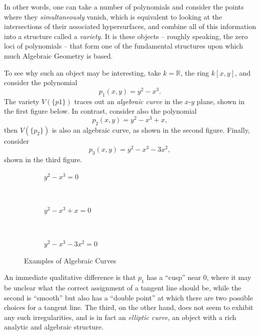 \documentclass{article}
\theoremstyle{definition}
\newcommand{\RR}{\mathbb{R}}
\newcommand{\theset}[1]{\{ #1 \}}
\begin{document}
In other words, one can take a number of polynomials and consider the
points where they \emph{simultaneously} vanish, which is equivalent to
looking at the intersections of their associated hypersurfaces, and
combine all of this information into a structure called a
\emph{variety}. It is these objects -- roughly speaking, the zero loci
of polynomials -- that form one of the fundamental structures upon
which much Algebraic Geometry is based.

To see why such an object may be interesting, take \(k=\RR\), the ring
\(k[x,y]\), and consider the polynomial \[p_1(x,y) = y^2-x^3.\] The
variety \(V(\theset{p1})\) traces out an \emph{algebraic curve} in the
\(x\)-\(y\) plane, shown in the first figure below. In contrast, consider also the
polynomial \[p_2(x,y) = y^2-x^3+x,\] then \(V(\theset{p_2})\) is also an
algebraic curve, as shown in the second figure. Finally, consider
\[p_3(x,y) = y^{2} - x^{3}-3x^{2},\] shown in the third figure.

\begin{figure}[H]
\centering
\begin{subfigure}[b]{0.3\textwidth}

\caption{$y^2-x^3 = 0$}
\label{fig:gull13}
\end{subfigure}
~ %
\begin{subfigure}[b]{0.3\textwidth}

\caption{$y^2-x^3+x = 0$}
\label{fig:tiger2}
\end{subfigure}
~ %
\begin{subfigure}[b]{0.3\textwidth}

\caption{$y^{2} - x^{3}-3x^{2} = 0$}
\label{fig:mouse15}
\end{subfigure}
\caption{Examples of Algebraic Curves}\label{fig:animals17}
\end{figure}

An immediate qualitative difference is that \(p_1\) has a ``cusp'' near 0,
where it may be unclear what the correct assignment of a tangent line
should be, while the second is ``smooth'' but also has a ``double point'' at
which there are two possible choices for a tangent line. The third, on
the other hand, does not seem to exhibit any such irregularities, and is in fact an \textit{elliptic curve}, an object with a
rich analytic and algebraic structure.
\end{document}

